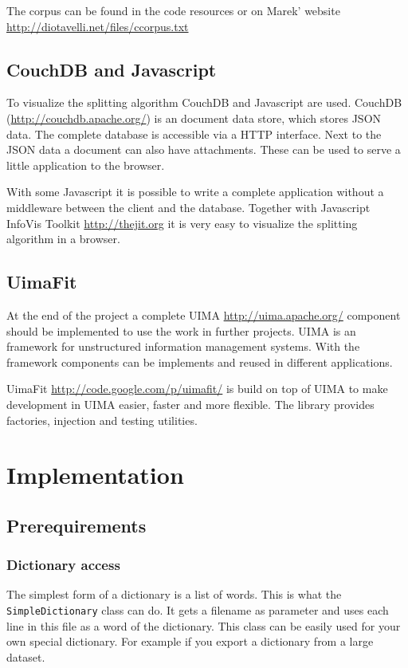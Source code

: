 \documentclass[11pt, accentcolor=tud9b, nochapname]{tudreport}
\begin{document}
The corpus can be found in the code resources or on Marek'
website \url{http://diotavelli.net/files/ccorpus.txt}

\subsection{CouchDB and Javascript}
To visualize the splitting algorithm CouchDB and Javascript
are used. CouchDB (\url{http://couchdb.apache.org/}) is an document data store, which stores JSON data. The complete database is accessible via a HTTP interface. Next to the JSON data a document can also have attachments. These can be used to serve a little application to the browser.

With some Javascript it is possible to write a complete application
without a middleware between the client and the database. Together with
Javascript InfoVis Toolkit \url{http://thejit.org} it is very
easy to visualize the splitting algorithm in a browser.

\subsection{UimaFit}
At the end of the project a complete UIMA \url{http://uima.apache.org/} component should be implemented to use the work in further projects. UIMA is an framework for unstructured information management systems. With the framework components can be implements and reused in different applications.

UimaFit \url{http://code.google.com/p/uimafit/} is build on top of UIMA to make development in UIMA easier, faster and more flexible. The library provides factories, injection and testing utilities.

\section{Implementation}

\subsection{Prerequirements}

\subsubsection{Dictionary access}
The simplest form of a dictionary is a list of words. This is what the \texttt{SimpleDictionary} class can do. It gets a filename as parameter and uses each line in this file as a word of the dictionary. This class can be easily used for your own special dictionary. For example if you export a dictionary from a large dataset.
\end{document}

